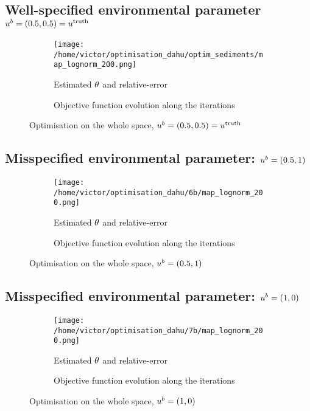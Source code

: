 \documentclass[../../Main_ManuscritThese.tex]{subfiles}
\begin{document}
\subsection*{Well-specified environmental parameter $u^b=(0.5, 0.5) = u^{\mathrm{truth}}$}
\label{sec:appendix_truth_optim}
\begin{figure}[ht]
  \begin{subfigure}{\textwidth}
  \centering
  \texttt{[image: /home/victor/optimisation\_dahu/optim\_sediments/map\_lognorm\_200.png]}
  \caption{Estimated $\theta$ and relative-error}
\end{subfigure}
\begin{subfigure}{\textwidth}
  \centering
  \resizebox{1\textwidth}{!}{}
    \caption{Objective function evolution along the iterations}
  \end{subfigure}
  \caption{Optimisation on the whole space, $u^b=(0.5, 0.5) = u^{\mathrm{truth}}$}
\end{figure}
\clearpage
\subsection*{Misspecified environmental parameter: $u^b=(0.5, 1)$}
\begin{figure}[ht]
  \begin{subfigure}{\textwidth}
  \centering
  \texttt{[image: /home/victor/optimisation\_dahu/6b/map\_lognorm\_200.png]}
  \caption{Estimated $\theta$ and relative-error}
\end{subfigure}
\begin{subfigure}{\textwidth}
  \centering
  \resizebox{1\textwidth}{!}{}
    \caption{Objective function evolution along the iterations}
  \end{subfigure}
  \caption{Optimisation on the whole space, $u^b=(0.5, 1)$}
\end{figure}
\clearpage

\subsection*{Misspecified environmental parameter: $u^b=(1, 0)$}
\begin{figure}[ht]
  \begin{subfigure}{\textwidth}
  \centering
  \texttt{[image: /home/victor/optimisation\_dahu/7b/map\_lognorm\_200.png]}
  \caption{Estimated $\theta$ and relative-error}
\end{subfigure}
\begin{subfigure}{\textwidth}
  \centering
  \resizebox{1\textwidth}{!}{}
    \caption{Objective function evolution along the iterations}
\end{subfigure}
\caption{Optimisation on the whole space, $u^b=(1, 0)$}
\end{figure}
\clearpage
\end{document}
